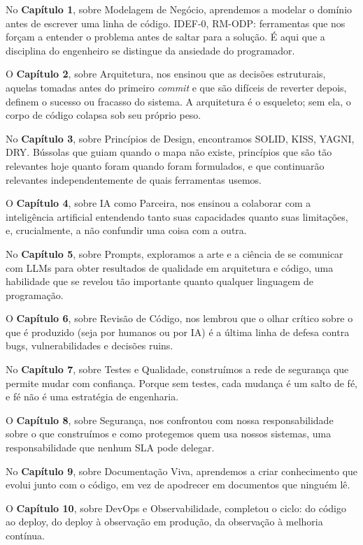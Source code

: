No \textbf{Capítulo 1}, sobre Modelagem de Negócio, aprendemos a modelar o domínio antes de escrever uma linha de código. IDEF-0, RM-ODP: ferramentas que nos forçam a entender o problema antes de saltar para a solução. É aqui que a disciplina do engenheiro se distingue da ansiedade do programador.

O \textbf{Capítulo 2}, sobre Arquitetura, nos ensinou que as decisões estruturais, aquelas tomadas antes do primeiro \textit{commit} e que são difíceis de reverter depois, definem o sucesso ou fracasso do sistema. A arquitetura é o esqueleto; sem ela, o corpo de código colapsa sob seu próprio peso.

No \textbf{Capítulo 3}, sobre Princípios de Design, encontramos SOLID, KISS, YAGNI, DRY. Bússolas que guiam quando o mapa não existe, princípios que são tão relevantes hoje quanto foram quando foram formulados, e que continuarão relevantes independentemente de quais ferramentas usemos.

O \textbf{Capítulo 4}, sobre IA como Parceira, nos ensinou a colaborar com a inteligência artificial entendendo tanto suas capacidades quanto suas limitações, e, crucialmente, a não confundir uma coisa com a outra.

No \textbf{Capítulo 5}, sobre Prompts, exploramos a arte e a ciência de se comunicar com LLMs para obter resultados de qualidade em arquitetura e código, uma habilidade que se revelou tão importante quanto qualquer linguagem de programação.

O \textbf{Capítulo 6}, sobre Revisão de Código, nos lembrou que o olhar crítico sobre o que é produzido (seja por humanos ou por IA) é a última linha de defesa contra bugs, vulnerabilidades e decisões ruins.

No \textbf{Capítulo 7}, sobre Testes e Qualidade, construímos a rede de segurança que permite mudar com confiança. Porque sem testes, cada mudança é um salto de fé, e fé não é uma estratégia de engenharia.

O \textbf{Capítulo 8}, sobre Segurança, nos confrontou com nossa responsabilidade sobre o que construímos e como protegemos quem usa nossos sistemas, uma responsabilidade que nenhum SLA pode delegar.

No \textbf{Capítulo 9}, sobre Documentação Viva, aprendemos a criar conhecimento que evolui junto com o código, em vez de apodrecer em documentos que ninguém lê.

O \textbf{Capítulo 10}, sobre DevOps e Observabilidade, completou o ciclo: do código ao deploy, do deploy à observação em produção, da observação à melhoria contínua.

